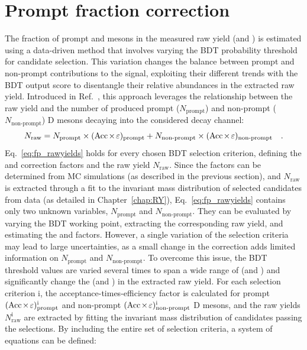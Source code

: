 \section{Prompt fraction correction}\label{sec:fp}
The fraction of prompt \ds and \dpl mesons in the measured raw yield (\fpds and \fpdpl) is estimated using a data-driven method that involves varying the BDT probability threshold for candidate selection. This variation changes the balance between prompt and non-prompt contributions to the signal, exploiting their different trends with the BDT output score to disentangle their relative abundances in the extracted raw yield. Introduced in Ref.~\cite{ALICE:2021mgk}, this approach leverages the relationship between the raw yield and the number of produced prompt ($N_\mathrm{prompt}$) and non-prompt ($N_\mathrm{non\text{-}prompt}$) D mesons decaying into the considered decay channel:
\begin{equation}\label{eq:fp_rawyields}
    N_\mathrm{raw} = N_\mathrm{prompt}\times(\mathrm{Acc}\mkern-2mu\times\mkern-2mu\varepsilon)_\mathrm{prompt} + N_\mathrm{non\text{-}prompt} \times (\mathrm{Acc}\mkern-2mu\times\mkern-2mu\varepsilon)_\mathrm{non\text{-}prompt}\quad .
\end{equation}
\vspace{0.1cm}
Eq.~\ref{eq:fp_rawyields} holds for every chosen BDT selection criterion, defining the \aeffp and \aeffnp correction factors and the raw yield $N_\mathrm{raw}$. Since the \aeff factors can be determined from MC simulations (as described in the previous section), and $N_\mathrm{raw}$ is extracted through a fit to the invariant mass distribution of selected candidates from data (as detailed in Chapter~\ref{chap:RY}), Eq.~\ref{eq:fp_rawyields} contains only two unknown variables, $N_\mathrm{prompt}$ and $N_\mathrm{non\text{-}prompt}$. They can be evaluated by varying the BDT working point, extracting the corresponding raw yield, and estimating the \aeffp and \aeffnp factors. However, a single variation of the selection criteria may lead to large uncertainties, as a small change in the \aeff correction adds limited information on $N_\mathrm{prompt}$ and $N_\mathrm{non\text{-}prompt}$. To overcome this issue, the BDT threshold values are varied several times to span a wide range of \aeffp (and \aeffnp) and significantly change the \fp (and \fnp) in the extracted raw yield. For each selection criterion i, the acceptance-times-efficiency factor is calculated for prompt $(\mathrm{Acc}\mkern-2mu\times\mkern-2mu\varepsilon)_\mathrm{prompt}^\mathrm{i}$ and non-prompt $(\mathrm{Acc}\mkern-2mu\times\mkern-2mu\varepsilon)_\mathrm{non\text{-}prompt}^\mathrm{i}$ D mesons, and the raw yields $N_\mathrm{raw}^\mathrm{i}$ are extracted by fitting the invariant mass distribution of candidates passing the selections. By including the entire set of selection criteria, a system of equations can be defined:

